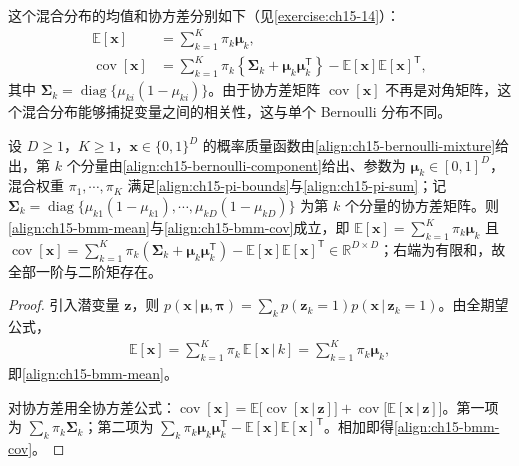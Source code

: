 \documentclass[../../main.tex]{subfiles}
\begin{document}
这个混合分布的均值和协方差分别如下（见\cref{exercise:ch15-14}）：
\begin{align}
\mathbb{E}[\bm{x}]&=\sum_{k=1}^{K}\pi_k\bm{\mu}_k,
\label{align:ch15-bmm-mean}\\
\operatorname{cov}[\bm{x}]&=\sum_{k=1}^{K}\pi_k\!\left\{\bm{\Sigma}_k+\bm{\mu}_k\bm{\mu}_k^{\mathsf T}\right\}-\mathbb{E}[\bm{x}]\mathbb{E}[\bm{x}]^{\mathsf T},
\label{align:ch15-bmm-cov}
\end{align}
其中 $\bm{\Sigma}_k=\operatorname{diag}\{\mu_{ki}(1-\mu_{ki})\}$。由于协方差矩阵 $\operatorname{cov}[\bm{x}]$ 不再是对角矩阵，这个混合分布能够捕捉变量之间的相关性，这与单个 Bernoulli 分布不同。

\begin{proposition}\label{proposition:ch15-Bernoulli混合矩}
设 $D\geqslant1$，$K\geqslant1$，$\bm{x}\in\{0,1\}^{D}$ 的概率质量函数由\eqref{align:ch15-bernoulli-mixture}给出，第 $k$ 个分量由\eqref{align:ch15-bernoulli-component}给出、参数为 $\bm{\mu}_k\in[0,1]^{D}$，混合权重 $\pi_1,\cdots,\pi_K$ 满足\eqref{align:ch15-pi-bounds}与\eqref{align:ch15-pi-sum}；记 $\bm{\Sigma}_k=\operatorname{diag}\{\mu_{k1}(1-\mu_{k1}),\cdots,\mu_{kD}(1-\mu_{kD})\}$ 为第 $k$ 个分量的协方差矩阵。则\eqref{align:ch15-bmm-mean}与\eqref{align:ch15-bmm-cov}成立，即 $\mathbb{E}[\bm{x}]=\sum_{k=1}^{K}\pi_k\bm{\mu}_k$ 且 $\operatorname{cov}[\bm{x}]=\sum_{k=1}^{K}\pi_k(\bm{\Sigma}_k+\bm{\mu}_k\bm{\mu}_k^{\mathsf T})-\mathbb{E}[\bm{x}]\mathbb{E}[\bm{x}]^{\mathsf T}\in\mathbb{R}^{D\times D}$；右端为有限和，故全部一阶与二阶矩存在。
\end{proposition}
\begin{proof}
引入潜变量 $\bm{z}$，则 $p(\bm{x}\,|\,\bm{\mu},\bm{\pi})=\sum_k p(\bm{z}_k=1)p(\bm{x}\,|\,\bm{z}_k=1)$。由全期望公式，
\begin{align*}
\mathbb{E}[\bm{x}]=\sum_{k=1}^{K}\pi_k\,\mathbb{E}[\bm{x}\,|\,k]=\sum_{k=1}^{K}\pi_k\bm{\mu}_k,
\end{align*}
即\eqref{align:ch15-bmm-mean}。

对协方差用全协方差公式：$\operatorname{cov}[\bm{x}]=\mathbb{E}\big[\operatorname{cov}[\bm{x}\,|\,\bm{z}]\big]+\operatorname{cov}\big[\mathbb{E}[\bm{x}\,|\,\bm{z}]\big]$。第一项为 $\sum_k\pi_k\bm{\Sigma}_k$；第二项为 $\sum_k\pi_k\bm{\mu}_k\bm{\mu}_k^{\mathsf T}-\mathbb{E}[\bm{x}]\mathbb{E}[\bm{x}]^{\mathsf T}$。相加即得\eqref{align:ch15-bmm-cov}。
\end{proof}
\end{document}
